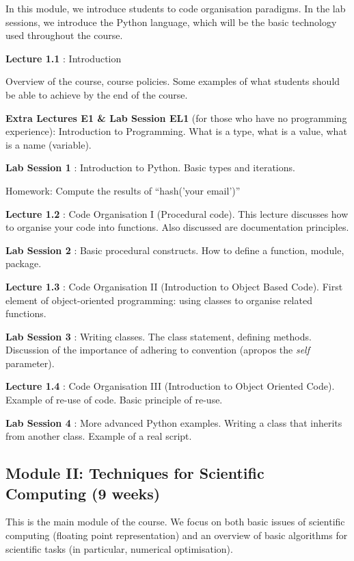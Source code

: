 \documentclass{article}
\newcommand*{\Lecture}[1]{%
{\bf #1}%
}
\begin{document}
In this module, we introduce students to code organisation paradigms. In the lab sessions, we introduce the Python language, which will be the basic technology used throughout the course.

\Lecture{Lecture 1.1}: Introduction

Overview of the course, course policies. Some examples of what students should be able to achieve by the end of the course.

\Lecture{Extra Lectures E1 \& Lab Session EL1} (for those who have no programming experience): Introduction to Programming. What is a type, what is a value, what is a name (variable).

\Lecture{Lab Session 1}: Introduction to Python. Basic types and iterations.

Homework: Compute the results of ``hash('your email')'' %

\Lecture{Lecture 1.2}: Code Organisation I (Procedural code). This lecture discusses how to organise your code into functions. Also discussed are documentation principles.

\Lecture{Lab Session 2}: Basic procedural constructs. How to define a function, module, package.

\Lecture{Lecture 1.3}: Code Organisation II (Introduction to Object Based Code). First element of object-oriented programming: using classes to organise related functions.

\Lecture{Lab Session 3}: Writing classes. The class statement, defining methods. Discussion of the importance of adhering to convention (apropos the \textsl{self} parameter).

\Lecture{Lecture 1.4}: Code Organisation III (Introduction to Object Oriented Code). Example of re-use of code. Basic principle of re-use.

\Lecture{Lab Session 4}: More advanced Python examples. Writing a class that inherits from another class. Example of a real script.

\subsection{Module II: Techniques for Scientific Computing (9 weeks)}

This is the main module of the course. We focus on both basic issues of scientific computing (floating point representation) and an overview of basic algorithms for scientific tasks (in particular, numerical optimisation).
\end{document}
